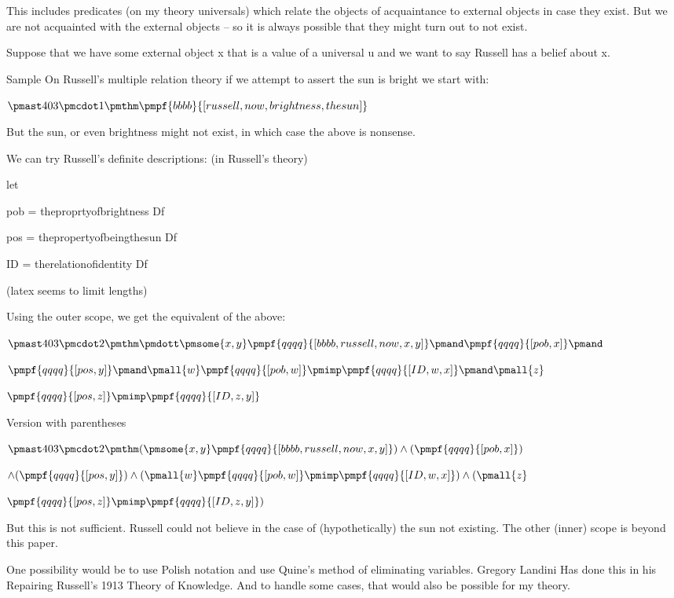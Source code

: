 \documentclass[12pt]{article}
\begin{document}
This includes predicates (on my theory universals) which relate the objects of acquaintance to external objects in case they exist. But we are not acquainted with the external objects – so it is always possible that they might turn out to not exist.

Suppose that we have some external object x that is a value of a universal u and we want to say Russell has a belief about x.

Sample
On Russell's multiple relation theory if we attempt to assert the sun is bright we start with:

$\pmast 403 \pmcdot 1 \pmthm \pmpf{bbbb}{[russell,now,brightness,thesun]}$

But the sun, or even brightness might not exist, in which case the above is nonsense.

We can try Russell's definite descriptions: (in Russell's theory)

let

pob = theproprtyofbrightness Df

pos = thepropertyofbeingthesun Df

ID = therelationofidentity Df

(latex seems to limit lengths)

Using the outer scope, we get the equivalent of the above:

$\pmast 403 \pmcdot 2 \pmthm \pmdott \pmsome{x,y} \pmpf{qqqq}{[bbbb, russell, now, x, y]} \pmand \pmpf{qqqq}{[pob, x]} \pmand $

$\pmpf{qqqq}{[pos, y]} \pmand \pmall{w} \pmpf{qqqq}{[pob, w]} \pmimp \pmpf{qqqq}{[ID, w, x]} \pmand \pmall{z} $

$\pmpf{qqqq}{[pos, z]} \pmimp \pmpf{qqqq}{[ID, z, y]} $
 
 

Version with parentheses

$\pmast 403 \pmcdot 2 \pmthm  (  \pmsome{x,y} \pmpf{qqqq}{[bbbb, russell, now, x, y]} ) \land ( \pmpf{qqqq}{[pob, x]} ) $

$\land ( \pmpf{qqqq}{[pos, y]} ) \land ( \pmall{w} \pmpf{qqqq}{[pob, w]} \pmimp \pmpf{qqqq}{[ID, w, x]} ) \land ( \pmall{z} $

$\pmpf{qqqq}{[pos, z]} \pmimp \pmpf{qqqq}{[ID, z, y]} )$


But this is not sufficient. Russell could not believe in the case of (hypothetically) the sun not existing. The other (inner) scope is beyond this paper.

One possibility would be to use Polish notation and use Quine's method of eliminating variables. Gregory Landini Has done this in his Repairing Russell's 1913 Theory of Knowledge. And to handle some cases, that would also be possible for my theory. 
\end{document}
